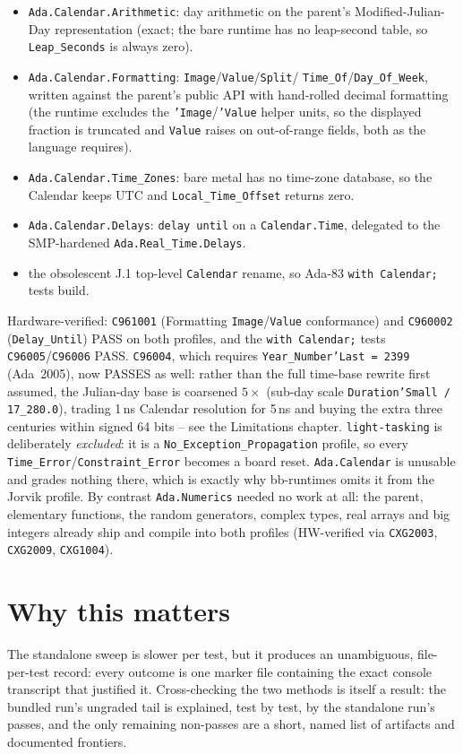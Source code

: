 \begin{itemize}
  \item \texttt{Ada.Calendar.Arithmetic}: day arithmetic on the parent's
        Modified-Julian-Day representation (exact; the bare runtime has no leap-second table,
        so \texttt{Leap\_Seconds} is always zero).
  \item \texttt{Ada.Calendar.Formatting}: \texttt{Image}/\texttt{Value}/\texttt{Split}/
        \texttt{Time\_Of}/\texttt{Day\_Of\_Week}, written against the parent's public API with
        hand-rolled decimal formatting (the runtime excludes the \texttt{'Image}/\texttt{'Value}
        helper units, so the displayed fraction is truncated and \texttt{Value} raises on
        out-of-range fields, both as the language requires).
  \item \texttt{Ada.Calendar.Time\_Zones}: bare metal has no time-zone database, so the
        Calendar keeps UTC and \texttt{Local\_Time\_Offset} returns zero.
  \item \texttt{Ada.Calendar.Delays}: \texttt{delay until} on a \texttt{Calendar.Time},
        delegated to the SMP-hardened \texttt{Ada.Real\_Time.Delays}.
  \item the obsolescent J.1 top-level \texttt{Calendar} rename, so Ada-83 \texttt{with Calendar;}
        tests build.
\end{itemize}

Hardware-verified: \texttt{C961001} (Formatting \texttt{Image}/\texttt{Value} conformance) and
\texttt{C960002} (\texttt{Delay\_Until}) PASS on both profiles, and the \texttt{with Calendar;}
tests \texttt{C96005}/\texttt{C96006} PASS. \texttt{C96004}, which requires
\texttt{Year\_Number'Last = 2399} (Ada~2005), now PASSES as well: rather than the
full time-base rewrite first assumed, the Julian-day base is coarsened $5\times$
(sub-day scale \texttt{Duration'Small\,/\,17\_280.0}), trading 1\,ns Calendar
resolution for 5\,ns and buying the extra three centuries within signed 64 bits --
see the Limitations chapter. \texttt{light-tasking} is deliberately
\emph{excluded}: it is a \texttt{No\_Exception\_Propagation} profile, so every
\texttt{Time\_Error}/\texttt{Constraint\_Error} becomes a board reset. \texttt{Ada.Calendar}
is unusable and grades nothing there, which is exactly why bb-runtimes omits it from the Jorvik
profile. By contrast \texttt{Ada.Numerics} needed no work at all: the parent, elementary
functions, the random generators, complex types, real arrays and big integers already ship and
compile into both profiles (HW-verified via \texttt{CXG2003}, \texttt{CXG2009}, \texttt{CXG1004}).

\section{Why this matters}

The standalone sweep is slower per test, but it produces an unambiguous, file-per-test
record: every outcome is one marker file containing the exact console transcript that
justified it. Cross-checking the two methods is itself a result: the bundled run's
ungraded tail is explained, test by test, by the standalone run's passes, and the only
remaining non-passes are a short, named list of artifacts and documented frontiers.
